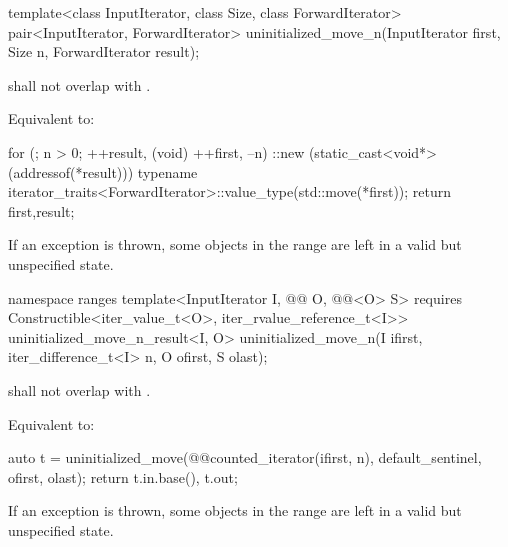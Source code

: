 %
\begin{itemdecl}
template<class InputIterator, class Size, class ForwardIterator>
  pair<InputIterator, ForwardIterator>
    uninitialized_move_n(InputIterator first, Size n, ForwardIterator result);
\end{itemdecl}

\begin{itemdescr}
\begin{addedblock}
\pnum
\expects
{} shall not overlap with .
\end{addedblock}

\pnum
\effects
Equivalent to:
\begin{codeblock}
for (; n > 0; ++result, (void) ++first, --n)
  ::new (static_cast<void*>(addressof(*result)))
    typename iterator_traits<ForwardIterator>::value_type(std::move(*first));
return {first,result};
\end{codeblock}

\pnum
\remarks
If an exception is thrown, some objects in the range
are left in a valid but unspecified state.
\end{itemdescr}

\begin{addedblock}
%
\begin{itemdecl}
namespace ranges {
  template<InputIterator I, @@ O, @@<O> S>
      requires Constructible<iter_value_t<O>, iter_rvalue_reference_t<I>>
    uninitialized_move_n_result<I, O>
      uninitialized_move_n(I ifirst, iter_difference_t<I> n, O ofirst, S olast);
}
\end{itemdecl}

\begin{itemdescr}
\pnum
\expects
{} shall not overlap with
.

\pnum
\effects Equivalent to:
\begin{codeblock}
auto t = uninitialized_move(@@counted_iterator(ifirst, n),
                            default_sentinel{}, ofirst, olast);
return {t.in.base(), t.out};
\end{codeblock}

\pnum
\begin{note}
If an exception is thrown, some objects in the range
are left in a valid but unspecified state.
\end{note}
\end{itemdescr}
\end{addedblock}

